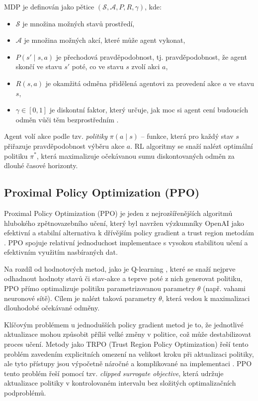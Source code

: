 MDP je definován jako pětice $(\mathcal{S},\mathcal{A},P,R,\gamma)$, kde:

\begin{itemize}
    \item $\mathcal{S}$ je množina možných stavů prostředí,
    \item $\mathcal{A}$ je množina možných akcí, které může agent vykonat,
    \item $P(s' \mid s,a)$ je přechodová pravděpodobnost, tj. pravděpodobnost, že agent skončí ve stavu
    $s'$ poté, co ve stavu $s$ zvolí akci $a$,
    \item $R(s,a)$ je okamžitá odměna přidělená agentovi za provedení akce $a$ ve stavu $s$,
    \item $\gamma \in [0,1]$ je diskontní faktor, který určuje, jak moc si agent cení budoucích odměn
    vůči těm bezprostředním \cite{Sutton2018}.
\end{itemize}

Agent volí akce podle tzv. \textit{politiky} $\pi(a\mid s)$ – funkce, která pro každý stav $s$ přiřazuje
pravděpodobnost výběru akce $a$. RL algoritmy se snaží nalézt optimální politiku $\pi^*$, která maximalizuje
očekávanou sumu diskontovaných odměn za dlouhé časové horizonty.

\subsection{Proximal Policy Optimization (PPO)}

Proximal Policy Optimization (PPO) je jeden z nejrozšířenějších algoritmů hlubokého zpětnovazebního učení,
který byl navržen výzkumníky OpenAI jako efektivní a stabilní alternativa k dřívějším policy gradient a trust region
metodám \cite{PPOOpenAI}\cite{Schulman2017}\cite{Jochec2024}. PPO spojuje relativní jednoduchost implementace s vysokou
stabilitou učení a efektivním využitím nasbíraných dat.

Na rozdíl od hodnotových metod, jako je Q-learning \cite{Watkins1992}\cite{Sutton2018}, které se snaží
nejprve odhadnout hodnoty stavů či stav-akce a teprve poté z nich generovat politiku, PPO přímo optimalizuje
politiku parametrizovanou parametry $\theta$ (např. vahami neuronové sítě). Cílem je nalézt taková
parametry $\theta$, která vedou k maximalizaci dlouhodobé očekávané odměny.

Klíčovým problémem u jednodušších policy gradient metod je to, že jednotlivé aktualizace mohou
způsobit příliš velké změny v politice, což může destabilizovat proces učení. Metody jako TRPO
(Trust Region Policy Optimization) řeší tento problém zavedením explicitních omezení na velikost
kroku při aktualizaci politiky, ale tyto přístupy jsou výpočetně náročné a komplikované na implementaci
\cite{Schulman2015}. PPO tento problém řeší pomocí tzv. \textit{clipped surrogate objective}, která
udržuje aktualizace politiky v kontrolovaném intervalu bez složitých optimalizačních podproblémů.

